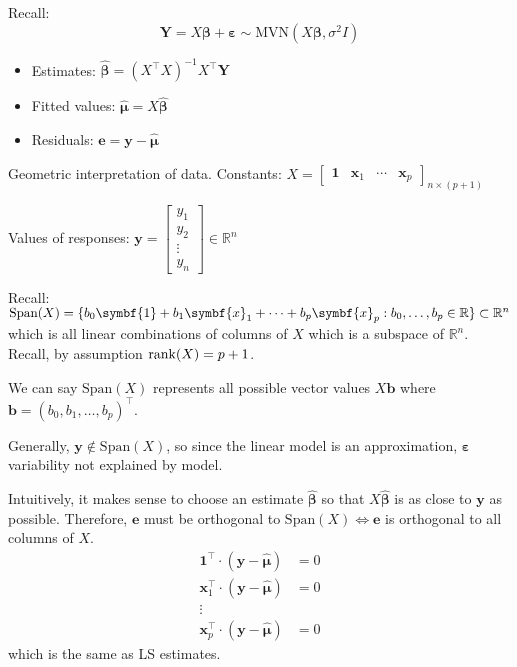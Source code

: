 Recall:
\[ \symbf{Y}=X\symbf{\beta}+\symbf{\varepsilon}
    \sim \text{MVN}(X\symbf{\beta},\sigma^2 I) \]
\begin{itemize}
    \item Estimates: $ \hat{\symbf{\beta}}=(X^\top X)^{-1}X^\top \symbf{Y} $
    \item Fitted values: $ \hat{\symbf{\mu}}=X\hat{\symbf{\beta}} $
    \item Residuals: $ \symbf{e}=\symbf{y}-\hat{\symbf{\mu}} $
\end{itemize}
Geometric interpretation of data.
Constants: $ X=\begin{bmatrix}
        \symbf{1} & \symbf{x}_1 & \cdots & \symbf{x}_p
    \end{bmatrix}_{n\times(p+1)} $

Values of responses: $
    \symbf{y}=\begin{bmatrix}
        y_1    \\
        y_2    \\
        \vdots \\
        y_n
    \end{bmatrix}\in\mathbb{R}^n $

Recall: $ \text{Span}(X)=
    \set{b_0\symbf{1}+b_1\symbf{x}_1+\cdots+b_p\symbf{x}_p:b_0,\ldots,b_p\in\mathbb{R}}
    \subset \mathbb{R}^n $
which is all linear combinations of columns of $ X $ which is a subspace
of $ \mathbb{R}^n $. Recall, by assumption
$ \operatorname{rank}(X)=p+1 $.

We can say $ \text{Span}(X) $ represents all possible vector
values $ X\symbf{b} $ where $ \symbf{b}=(b_0,b_1,\ldots,b_p)^\top $.

Generally, $ \symbf{y}\notin\text{Span}(X) $, so since
the linear model is an approximation, $ \symbf{\varepsilon} $
variability not explained by model.

Intuitively, it makes sense to choose an estimate
$ \hat{\symbf{\beta}} $ so that $ X\hat{\symbf{\beta}} $
is as close to $ \symbf{y} $ as possible. Therefore,
$ \symbf{e} $ must be orthogonal to $ \text{Span}(X)
    \iff \symbf{e} $ is orthogonal to all columns of $ X $.
\begin{align*}
    \symbf{1}^\top\cdot(\symbf{y}-\hat{\symbf{\mu}})   & =      0 \\
    \symbf{x}_1^\top\cdot(\symbf{y}-\hat{\symbf{\mu}}) & =      0 \\
    \vdots                                                        \\
    \symbf{x}_p^\top\cdot(\symbf{y}-\hat{\symbf{\mu}}) & =      0
\end{align*}
which is the same as LS estimates.

